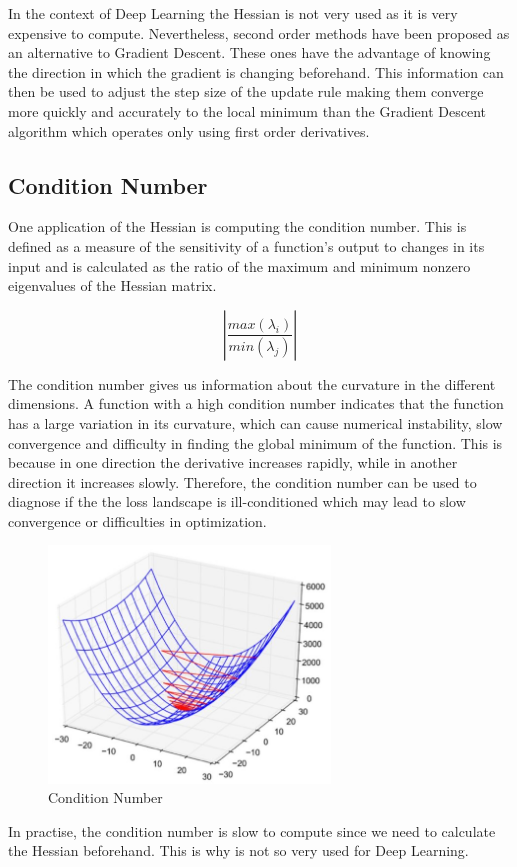 \noindent In the context of Deep Learning the Hessian is not very used as it is very expensive to compute. Nevertheless, second order methods have been proposed as an alternative to Gradient Descent. These ones have the advantage of knowing the direction in which the gradient is changing beforehand. This information can then be used to adjust the step size of the update rule making them converge more quickly and accurately to the local minimum than the Gradient Descent algorithm which operates only using first order derivatives.

\newpage
\subsection{Condition Number}

One application of the Hessian is computing the condition number. This is defined as a measure of the sensitivity of a function’s output to changes in its input and is calculated as the ratio of the maximum and minimum nonzero eigenvalues of the Hessian matrix.

$$ \left| \frac{ max(\lambda_i) }{min(\lambda_j)}  \right| $$


\noindent The condition number gives us information about the curvature in the different dimensions. A function with a high condition number indicates that the function has a large variation in its curvature, which can cause numerical instability, slow convergence and difficulty in finding the global minimum of the function. This is because in one direction the derivative increases rapidly, while in another direction it increases slowly. Therefore, the condition number can be used to diagnose if the the loss landscape is ill-conditioned which may lead to slow convergence or difficulties in optimization.


\begin{figure}[h]
    \centering
    \includegraphics[width=7.5cm]{Images/condition_number.jpg}
    \caption{Condition Number}
    \label{fig:condition-number}
\end{figure}

\noindent In practise, the condition number is slow to compute since we need to calculate the Hessian beforehand. This is why is not so very used for Deep Learning. 